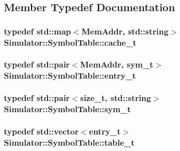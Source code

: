 \subsection{Member Typedef Documentation}
\hypertarget{class_simulator_1_1_symbol_table_a94faed151775b38fe61053121be020cc}{
\subsubsection[{cache\+\_\+t}]{\setlength{\rightskip}{0pt plus 5cm}typedef std\+::map$<$Mem\+Addr, std\+::string$>$ {\bf Simulator\+::\+Symbol\+Table\+::cache\+\_\+t}\hspace{0.3cm}{\ttfamily [protected]}}}\label{class_simulator_1_1_symbol_table_a94faed151775b38fe61053121be020cc}
\hypertarget{class_simulator_1_1_symbol_table_a91fddb0fa183ac55b5c501629b36478c}{
\subsubsection[{entry\+\_\+t}]{\setlength{\rightskip}{0pt plus 5cm}typedef std\+::pair$<$Mem\+Addr, {\bf sym\+\_\+t}$>$ {\bf Simulator\+::\+Symbol\+Table\+::entry\+\_\+t}}}\label{class_simulator_1_1_symbol_table_a91fddb0fa183ac55b5c501629b36478c}
\hypertarget{class_simulator_1_1_symbol_table_a4e34769946eecc536f237c68a92c3744}{
\subsubsection[{sym\+\_\+t}]{\setlength{\rightskip}{0pt plus 5cm}typedef std\+::pair$<$size\+\_\+t, std\+::string$>$ {\bf Simulator\+::\+Symbol\+Table\+::sym\+\_\+t}}}\label{class_simulator_1_1_symbol_table_a4e34769946eecc536f237c68a92c3744}
\hypertarget{class_simulator_1_1_symbol_table_a105ca53bbb8b93b0773a66b6d07f61f3}{
\subsubsection[{table\+\_\+t}]{\setlength{\rightskip}{0pt plus 5cm}typedef std\+::vector$<${\bf entry\+\_\+t}$>$ {\bf Simulator\+::\+Symbol\+Table\+::table\+\_\+t}\hspace{0.3cm}{\ttfamily [protected]}}}\label{class_simulator_1_1_symbol_table_a105ca53bbb8b93b0773a66b6d07f61f3}


